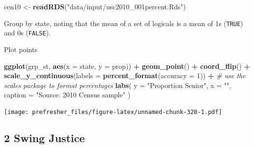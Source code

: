 \documentclass[]{book}
\newenvironment{Shaded}{\begin{snugshade}}{\end{snugshade}}
\newcommand{\CommentTok}[1]{\textcolor[rgb]{0.56,0.35,0.01}{\textit{#1}}}
\newcommand{\DataTypeTok}[1]{\textcolor[rgb]{0.13,0.29,0.53}{#1}}
\newcommand{\DecValTok}[1]{\textcolor[rgb]{0.00,0.00,0.81}{#1}}
\newcommand{\KeywordTok}[1]{\textcolor[rgb]{0.13,0.29,0.53}{\textbf{#1}}}
\newcommand{\NormalTok}[1]{#1}
\newcommand{\OperatorTok}[1]{\textcolor[rgb]{0.81,0.36,0.00}{\textbf{#1}}}
\newcommand{\StringTok}[1]{\textcolor[rgb]{0.31,0.60,0.02}{#1}}
\theoremstyle{definition}
\theoremstyle{definition}
\theoremstyle{definition}
\theoremstyle{remark}
\begin{document}
\begin{Shaded}
\begin{Highlighting}[]
\NormalTok{cen10 <-}\StringTok{ }\KeywordTok{readRDS}\NormalTok{(}\StringTok{"data/input/usc2010_001percent.Rds"}\NormalTok{)}
\end{Highlighting}
\end{Shaded}

Group by state, noting that the mean of a set of logicals is a mean of 1s (\texttt{TRUE}) and 0s (\texttt{FALSE}).

\begin{Shaded}
\end{Shaded}

Plot points

\begin{Shaded}
\begin{Highlighting}[]
\KeywordTok{ggplot}\NormalTok{(grp_st, }\KeywordTok{aes}\NormalTok{(}\DataTypeTok{x =}\NormalTok{ state, }\DataTypeTok{y =}\NormalTok{ prop)) }\OperatorTok{+}
\StringTok{  }\KeywordTok{geom_point}\NormalTok{() }\OperatorTok{+}
\StringTok{  }\KeywordTok{coord_flip}\NormalTok{() }\OperatorTok{+}
\StringTok{  }\KeywordTok{scale_y_continuous}\NormalTok{(}\DataTypeTok{labels =} \KeywordTok{percent_format}\NormalTok{(}\DataTypeTok{accuracy =} \DecValTok{1}\NormalTok{)) }\OperatorTok{+}\StringTok{ }\CommentTok{# use the scales package to format percentages}
\StringTok{  }\KeywordTok{labs}\NormalTok{(}
    \DataTypeTok{y =} \StringTok{"Proportion Senior"}\NormalTok{,}
    \DataTypeTok{x =} \StringTok{""}\NormalTok{,}
    \DataTypeTok{caption =} \StringTok{"Source: 2010 Census sample"}
\NormalTok{  )}
\end{Highlighting}
\end{Shaded}

\texttt{[image: prefresher\_files/figure-latex/unnamed-chunk-328-1.pdf]}

\hypertarget{swing-justice}{%
\subsection*{2 Swing Justice}\label{swing-justice}}
\end{document}
